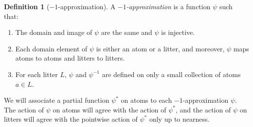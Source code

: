 \documentclass[112pt]{article}
\theoremstyle{definition}
\newtheorem{definition}[theorem]{Definition}
\theoremstyle{remark}
\begin{document}
\begin{definition}[$-1$-approximation]\label{def:base_approx}
  A {\em $-1$-approximation\/} is a function $\psi$ such that:
  \begin{enumerate}
    \item The domain and image of $\psi$ are the same and $\psi$ is injective.
    \item Each domain element of $\psi$ is either an atom or a litter, and moreover, $\psi$ maps atoms to atoms and litters to litters.
    \item For each litter $L$, $\psi$ and $\psi^{-1}$ are defined on only a small collection of atoms $a \in L$.
  \end{enumerate}
\end{definition}
We will associate a partial function $\psi^*$ on atoms to each $-1$-approximation $\psi$.
The action of $\psi$ on atoms will agree with the action of $\psi^*$, and the action of $\psi$ on litters will agree with the pointwise action of $\psi^*$ only up to nearness.
\end{document}

